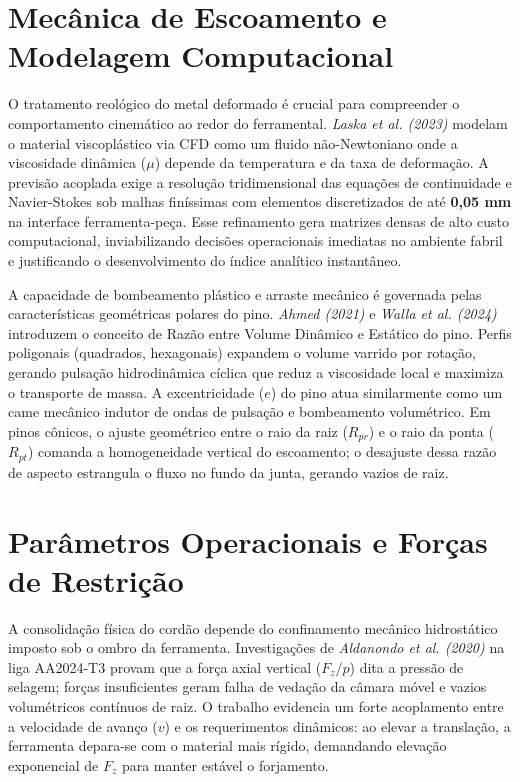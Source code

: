 \documentclass[12pt,openany]{report}
\begin{document}
\section{Mecânica de Escoamento e Modelagem Computacional}

O tratamento reológico do metal deformado é crucial para compreender o comportamento cinemático ao redor do ferramental. \textit{Laska et al. (2023)} modelam o material viscoplástico via CFD como um fluido não-Newtoniano onde a viscosidade dinâmica ($\mu$) depende da temperatura e da taxa de deformação. A previsão acoplada exige a resolução tridimensional das equações de continuidade e Navier-Stokes sob malhas finíssimas com elementos discretizados de até \textbf{0,05 mm} na interface ferramenta-peça. Esse refinamento gera matrizes densas de alto custo computacional, inviabilizando decisões operacionais imediatas no ambiente fabril e justificando o desenvolvimento do índice analítico instantâneo.

A capacidade de bombeamento plástico e arraste mecânico é governada pelas características geométricas polares do pino. \textit{Ahmed (2021)} e \textit{Walla et al. (2024)} introduzem o conceito de Razão entre Volume Dinâmico e Estático do pino. Perfis poligonais (quadrados, hexagonais) expandem o volume varrido por rotação, gerando pulsação hidrodinâmica cíclica que reduz a viscosidade local e maximiza o transporte de massa. A excentricidade ($e$) do pino atua similarmente como um came mecânico indutor de ondas de pulsação e bombeamento volumétrico. Em pinos cônicos, o ajuste geométrico entre o raio da raiz ($R_{pr}$) e o raio da ponta ($R_{pt}$) comanda a homogeneidade vertical do escoamento; o desajuste dessa razão de aspecto estrangula o fluxo no fundo da junta, gerando vazios de raiz.

\section{Parâmetros Operacionais e Forças de Restrição}

A consolidação física do cordão depende do confinamento mecânico hidrostático imposto sob o ombro da ferramenta. Investigações de \textit{Aldanondo et al. (2020)} na liga AA2024-T3 provam que a força axial vertical ($F_z/p$) dita a pressão de selagem; forças insuficientes geram falha de vedação da câmara móvel e vazios volumétricos contínuos de raiz. O trabalho evidencia um forte acoplamento entre a velocidade de avanço ($v$) e os requerimentos dinâmicos: ao elevar a translação, a ferramenta depara-se com o material mais rígido, demandando elevação exponencial de $F_z$ para manter estável o forjamento.
\end{document}
